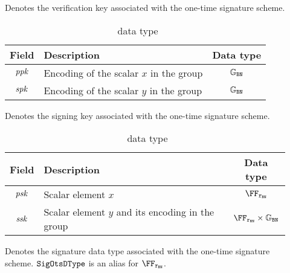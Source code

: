 \begin{description}
    \item[\vkOtsDType] Denotes the verification key associated with the one-time signature scheme.
        \begin{table}[H]
        \centering
        \begin{tabular}{cp{20em}c}
            Field & Description & Data type\\ \toprule
            $\mathit{ppk}$ & Encoding of the scalar $x$ in the group & $\mathbb{G}_{\mathtt{BN}}$ \\ \midrule
            $\mathit{spk}$ & Encoding of the scalar $y$ in the group & $\mathbb{G}_{\mathtt{BN}}$ \\ \bottomrule
        \end{tabular}
        \caption{\vkOtsDType~data type}\label{instantiation:tab:vk-ots-dtype}
        \end{table}
    \item[\skOtsDType] Denotes the signing key associated with the one-time signature scheme.
        \begin{table}[H]
        \centering
        \begin{tabular}{cp{20em}c}
            Field & Description & Data type\\ \toprule
            $\mathit{psk}$ & Scalar element $x$ & $\FFx{\rBN}$ \\ \midrule
            $\mathit{ssk}$ & Scalar element $y$ and its encoding in the group & $\FFx{\rBN} \times \gsetBN$ \\ \midrule
        \end{tabular}
        \caption{\skOtsDType~data type}\label{instantiation:tab:sk-ots-dtype}
        \end{table}
    \item[\sigOtsDType] Denotes the signature data type associated with the one-time signature scheme. ${\mathtt{SigOtsDType}}$ is an alias for $\FFx{\rBN}$.
\end{description}
